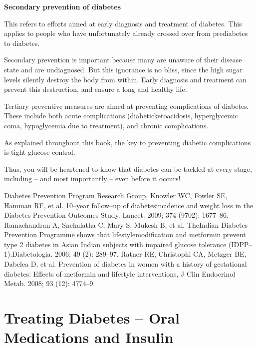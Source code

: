 \noindent\textbf{Secondary prevention of diabetes}

This refers to efforts aimed at early diagnosis and treatment of dia\-betes. This applies to people who have unfortunately already crossed over from prediabetes to diabetes.

Secondary prevention is important because many are unaware of their disease state and are undiagnosed. But this ignorance is no bliss, since the high sugar levels silently destroy the body from within. Early diagnosis and treatment can prevent this destruction, and ensure a long and healthy life.

\vskip 6pt


Tertiary preventive measures are aimed at preventing complications of diabetes. These include both acute complications (diabetic\break ketoacidosis, hyperglycemic coma, hypoglycemia due to treatment), and chronic complications.

As explained throughout this book, the key to preventing diabetic complications is tight glucose control.

Thus, you will be heartened to know that diabetes can be tackled at every stage, including – and most importantly – even before it occurs!

\begin{thebibliography}{99}
 Diabetes Prevention Program Research Group, Knowler WC, Fowler SE, Hamman RF, et al. 10–year follow–up of diabetes\break incidence and weight loss in the Diabetes Prevention Outcomes Study. Lancet. 2009; 374 (9702): 1677–86.
 Ramachandran A, Snehalatha C, Mary S, Mukesh B, et al. The\break Indian Diabetes Prevention Programme shows that lifestyle\break modification and metformin prevent type 2 diabetes in Asian Indian subjects with impaired glucose tolerance (IDPP–1).\break Diabetologia. 2006; 49 (2): 289–97.
 Ratner RE, Christophi CA, Metzger BE, Dabelea D, et al. Prevention of diabetes in women with a history of gestational diabetes: Effects of metformin and lifestyle interventions, J Clin Endocrinol Metab. 2008; 93 (12): 4774–9.
\end{thebibliography}


\chapter{Treating Diabetes – Oral Medications and Insulin}\label{chap26}


